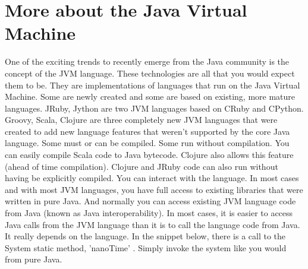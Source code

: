 \chapter{More about the Java Virtual Machine}

One of the exciting trends to recently emerge from the Java community is the
concept of the JVM language. These technologies are all that you would expect
them to be. They are implementations of languages that run on the Java Virtual
Machine. Some are newly created and some are based on existing, more mature
languages. JRuby, Jython are two JVM languages based on CRuby and CPython.
Groovy, Scala, Clojure are three completely new JVM languages that were created
to add new language features that weren't supported by the core Java language.
Some must or can be compiled. Some run without compilation. You can easily
compile Scala code to Java bytecode. Clojure also allows this feature (ahead of
time compilation). Clojure and JRuby code can also run without having be
explicitly compiled. You can interact with the language. In most cases and with
most JVM languages, you have full access to existing libraries that were written
in pure Java. And normally you can access existing JVM language code from Java
(known as Java interoperability). In most cases, it is easier to access Java
calls from the JVM language than it is to call the language code from Java. It
really depends on the language. In the snippet below, there is a call to the
System static method, 'nanoTime' . Simply invoke the system like you would from
pure Java.

